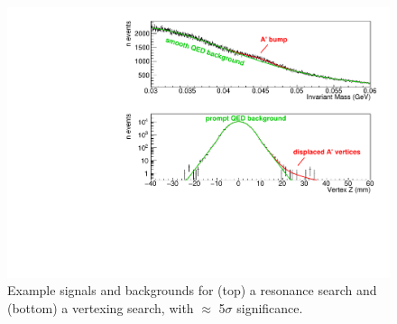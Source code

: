 \documentclass[b1]{sciposter}
\begin{document}
\begin{multicols}{3}
	\begin{figure}
		\begin{center}
	\includegraphics[width=1.00\textwidth,trim ={0 0 0.5cm 0}]{sig_examples}
		\end{center}
		\caption{Example signals and backgrounds for (top) a resonance search and (bottom) a vertexing search, with $\approx$ 5$\sigma$ significance.}
	\end{figure}


	\begin{figure}
		\begin{center}


\end{center}
\end{figure}
\end{multicols}
\end{document}
